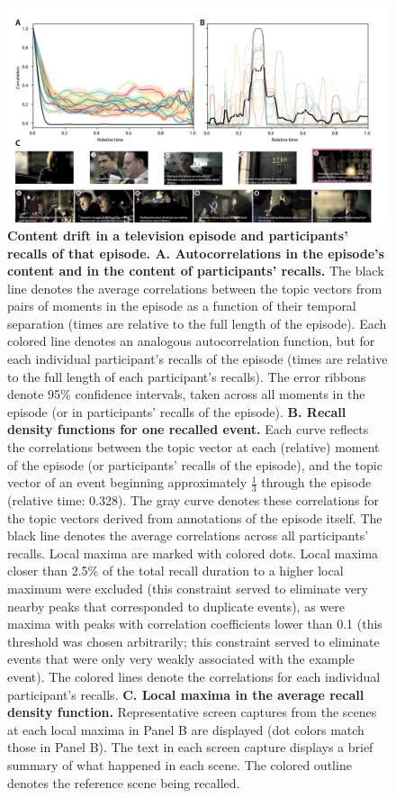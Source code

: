 \documentclass{article}
\begin{document}
\begin{figure}[tp] \centering \includegraphics[width=\textwidth]{figs/reinstatement} \caption{\textbf{Content drift in a television episode and participants' recalls of that episode.  A.  Autocorrelations in the episode's content and in the content of participants' recalls.}  The black line denotes the average correlations between the topic vectors from pairs of moments in the episode as a function of their temporal separation (times are relative to the full length of the episode).  Each colored line denotes an analogous autocorrelation function, but for each individual participant's recalls of the episode (times are relative to the full length of each participant's recalls).  The error ribbons denote 95\% confidence intervals, taken across all moments in the episode (or in participants' recalls of the episode).  \textbf{B. Recall density functions for one recalled event.} Each curve reflects the correlations between the topic vector at each (relative) moment of the episode (or participants' recalls of the episode), and the topic vector of an event beginning approximately $\frac{1}{3}$ through the episode (relative time: 0.328).  The gray curve denotes these correlations for the topic vectors derived from annotations of the episode itself. The black line denotes the average correlations across all participants' recalls.  Local maxima are marked with colored dots.  Local maxima closer than 2.5\% of the total recall duration to a higher local maximum were excluded (this constraint served to eliminate very nearby peaks that corresponded to duplicate events), as were maxima with peaks with correlation coefficients lower than 0.1 (this threshold was chosen arbitrarily; this constraint served to eliminate events that were only very weakly associated with the example event).   The colored lines denote the correlations for each individual participant's recalls.  \textbf{C. Local maxima in the average recall density function.}  Representative screen captures from the scenes at each local maxima in Panel B are displayed (dot colors match those in Panel B).  The text in each screen capture displays a brief summary of what happened in each scene. The colored outline denotes the reference scene being recalled.}

\end{figure}
\end{document}

